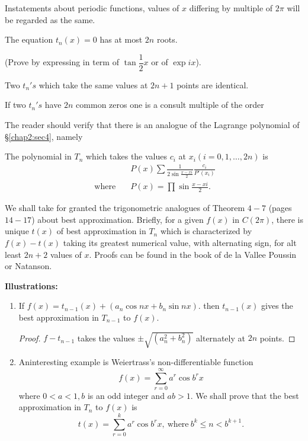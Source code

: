 In\pageoriginale statements about periodic functions, values of $x$ differing by
multiple of $2 \pi$ will be regarded as the same. 

\setcounter{lem}{0}
\begin{lem}\label{chap4:sec10:lem1}%
  The equation $t_n(x)=0$ has at most $2n$ roots.
\end{lem}
(Prove by expressing in term of $\tan \dfrac{1}{2}x$ or of $\exp ix$).

\setcounter{corollary}{0}
\begin{corollary}\label{chap4:sec10:coro1} %
  Two $t_n's $ which take the same values at $2n+1$ points are identical.
\end{corollary}

\begin{corollary}\label{chap4:sec10:coro2}%
  If two $t_n's$ have $2n$ common zeros one is a consult multiple of the order
\end{corollary}

The reader should verify that there is an analogue of the Lagrange
polynomial of \S \ref{chap2:sec4}, namely 

The polynomial in $T_n$ which takes the values $c_i$ at $x_i
(i=0,1,\ldots, 2n)$ is  
\begin{align*}
  & P(x) \sum \frac{1}{2\sin \frac{x-xi}{2}} \frac{c_i}{P'(x_i)}\\
  ~\text{where}\quad & P(x) =\prod \sin \frac{x-xi}{2}.
\end{align*}

We shall take for granted the trigonometric analogues of Theorem
$4-7$ (pages $14-17$) about best approximation. Briefly, for a given
$f(x)$ in $C(2 \pi)$, there is unique $t(x)$ of best approximation in
$T_n$ which is characterized by $f(x)-t(x)$ taking its greatest
numerical value, with alternating sign, for alt least $2n+2$ values of
$x$. Proofs can be found in the book of de la Vallee Poussin or
Natanson. 
\newpage

\noindent \textbf{Illustrations:}

\begin{enumerate}[1)]
\item If \qquad $f(x)=t_{n-1}(x)+ (a_n \cos nx +b_n \sin nx)$.
  then $t_{n-1}(x)$ gives the best approximation in $T_{n-1}$ to $f(x)$.
  \begin{proof}
    $f-t_{n-1}$ takes the values $\pm \sqrt{(a^2_n +b^2_n)}$ alternately
    at $2n$ points. 
  \end{proof}
\item An\pageoriginale interesting example is Weiertrass's non-differentiable function 
  $$
  f(x)= \sum^ \infty _{r=0} a^r \cos b^r x
  $$
  where $0< a<1,b$ is an odd integer and $ab> 1$. We shall prove that
  the best approximation in  $T_n$ to $f(x)$ is 
  $$
  t(x)=\sum ^k_{r=0}a^r \cos b^rx, ~\text{where}~ b^k\leq n< b^{k+1}.
  $$
\end{enumerate}

